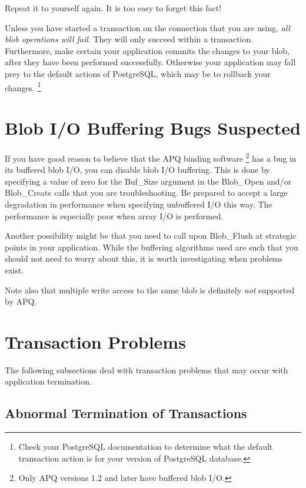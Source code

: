 \documentclass[english,letterpaper]{book}
\begin{document}
Repeat it to yourself again. It is too easy to forget this fact!

Unless you have started a transaction on the connection that you are
using, \emph{all blob operations will fail}. They will only succeed within
a transaction. Furthermore, make certain your application commits
the changes to your blob, after they have been performed successfully.
Otherwise your application may fall prey to the default actions of
PostgreSQL, which may be to rollback your changes.%
\footnote{Check your PostgreSQL documentation to determine what the default
transaction action is for your version of PostgreSQL database.}


\section{Blob I/O Buffering Bugs Suspected}

If you have good reason to believe that the APQ binding software%
\footnote{Only APQ versions 1.2 and later have buffered blob I/O.%
} has a bug in its buffered blob I/O, you can disable blob I/O buffering.
This is done by specifying a value of zero for the Buf\_Size argument
in the Blob\_Open and/or Blob\_Create calls that you are troubleshooting.
Be prepared to accept a large degradation in performance when specifying
unbuffered I/O this way. The performance is especially poor when array
I/O is performed.

Another possibility might be that you need to call upon Blob\_Flush
at strategic points in your application. While the buffering algorithms
used are such that you should not need to worry about this, it is
worth investigating when problems exist. 

Note also that multiple write access to the same blob is definitely
\emph{not} supported by APQ.


\section{Transaction Problems}

The following subsections deal with transaction problems that may
occur with application termination.


\subsection{Abnormal Termination of Transactions}
\end{document}
